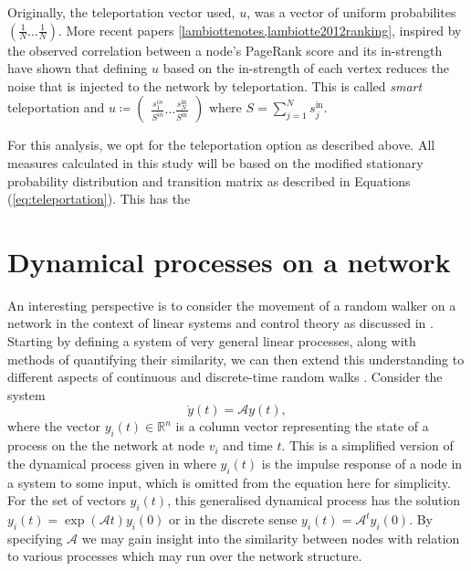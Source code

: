 \documentclass[12pt,a4paper]{article}
\begin{document}
\noindent Originally, the teleportation vector used, $u$, was a vector of uniform probabilites $( \frac{1}{N} \dots \frac{1}{N})$. More recent papers \ref{lambiottenotes,lambiotte2012ranking}, inspired by the observed correlation between a node's PageRank score and its in-strength have shown that defining $u$ based on the in-strength of each vertex reduces the noise that is injected to the network by teleportation. This is called \textit{smart} teleportation and
$u \coloneqq \begin{pmatrix} \frac{s^{in}_1}{S^{in}} \dots \frac{s^{\text{in}}_N}{S^{\text{in}}} \end{pmatrix} $ where $S = \sum\limits_{j=1}^N s^{\text{in}}_j$. \medskip

\noindent For this analysis, we opt for the teleportation option as described above. All measures calculated in this study will be based on the modified stationary probability distribution and transition matrix as described in Equations (\ref{eq:teleportation}). This has the

\section{Dynamical processes on a network}\label{section:dynamical processes}
An interesting perspective is to consider the movement of a random walker on a network in the context of linear systems and control theory as discussed in \cite{schaub2019multiscale}. Starting by defining a system of very general linear processes, along with methods of quantifying their similarity, we can then extend this understanding to different aspects of continuous and discrete-time random walks \cite{schaub2019multiscale}. Consider the system
\begin{equation}
\dot y(t) = \mathcal{A} y(t),
\label{eq:dynamical systems}
\end{equation}
\noindent where the vector $y_i (t) \in \mathbb R^n$ is a column vector representing the state of a process on the the network at node $v_i$ and time $t$. This is a simplified version of the dynamical process given in \cite{schaub2019multiscale} where $y_i(t)$ is the impulse response of a node in a system to some input, which is omitted from the equation here for simplicity. For the set of vectors $y_i(t)$, this generalised dynamical process has the solution $y_i(t)=\exp (\mathcal A t)y_i(0) $ or in the discrete sense $y_i(t)=\mathcal A^t y_i(0)$. By specifying $\mathcal A$ we may gain insight into the similarity between nodes with relation to various processes which may run over the network structure. \medskip\
\end{document}
